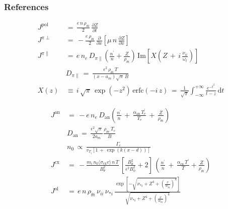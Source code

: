 \documentclass[10pt]{beamer}
\begin{document}

\begin{frame}
\frametitle{References}
\renewcommand*{\bibfont}{\tiny}
\printbibliography
\end{frame}


\appendix
\begin{frame} %
\begin{align}
	J^\text{pol} \,&=\, \frac{e \, n \, \rho_{\theta i}}{2} \,
		\frac{\partial Z}{\partial t} \\
	J^{\pi\perp} \,&=\, -\frac{e \, \rho_{\theta i}}{2} \,
		\frac{\partial}{\partial x} \left[\mu \, n \, \frac{\partial Z}
		{\partial x}\right] \\
	J^{\pi\parallel} \,&=\, e\,n_e\,D_{\pi\parallel}
		\left(\frac{n^\prime}{n} + \frac{Z}{\rho_{\theta i}}\right) \,
		\text{Im}\left[X\left(Z \,+\, i\,\frac{\nu_{ii}}{\omega_t}\right)
		\right] \\
	&D_{\pi\parallel} \,=\, \frac{\epsilon^2\,\rho_{\theta i}\,T}
		{(x - a_m)\sqrt{\pi}\,B} \\
		X(z) \,&\equiv\, i\,\sqrt{\pi} \, \exp(-z^2) \, \text{erfc}(-i\,z) \,=\,
		\frac{1}{\sqrt{\pi}} \int_{-\infty}^{+\infty} \frac{e^{-t^2}}{t - z}
		\, \text{d}t
\end{align}
\end{frame}

\begin{frame} %
\begin{align}
	J^\text{an} \,&=\, -e \, n_e \, D_\text{an} \left(\frac{n^\prime}{n}
		\,+\, \frac{\alpha_\text{an}\,T_e^\prime}{T_e} \,+\,
		\frac{Z}{\rho_{\theta i}}\right) \\
	&D_\text{an} \,=\, \frac{\epsilon^2 \sqrt{\pi}}{2 a_m}
		\frac{\rho_{\theta e} \, T_e}{B} \\
	&n_0 \,\propto\, \frac{\Gamma_c}{v_{T_i}\left[1 \,+\,
		\exp{(k(x - d))}\right]} \\
	J^\text{cx} \,&=\,
		-\frac{m_i \,n_0 \langle\sigma_\text{cx} v\rangle \, n\,T}{B_\theta^2}
		\, \left[\frac{B_\theta^2}{\epsilon^2 B_\phi^2} + 2\right] \,
		\left(\frac{n^\prime}{n} \,+\, \frac{\alpha_\text{cx}\,T^\prime}
		{T} + \frac{Z}{\rho_{\theta i}}\right) \\
	J^\text{ol} \,&=\, e \, n \, \rho_{\theta i} \, \nu_{ii} \, \nu_{*i} \,
		\frac{\exp\left[-\sqrt{\nu_{*i} + Z^4
		+ \left(\frac{x}{w_{bi}}\right)^4}\right]}{\sqrt{\nu_{*i} + Z^4
		+ \left(\frac{x}{w_{bi}}\right)^4}}
\end{align}
\end{frame}
\end{document}
